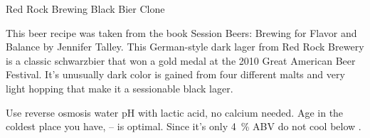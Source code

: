 \stylesection{\styleschwarzbier}

\begin{recipe}{Red Rock Brewing Black Bier Clone}

\begin{aboutblock}
This beer recipe was taken from the book Session Beers: Brewing for Flavor and
Balance by Jennifer Talley. This German-style dark lager from Red Rock Brewery
is a classic schwarzbier that won a gold medal at the 2010 Great American Beer
Festival. It's unusually dark color is gained from four different malts and very
light hopping that make it a sessionable black lager. \sourceaha
\end{aboutblock}


\begin{methodandtiming}
 
\begin{mashsteps}
\end{mashsteps}

\begin{fermentationsteps}
\end{fermentationsteps}

\begin{directions}
Use reverse osmosis water pH with lactic acid, no calcium needed.
Age in the coldest place you have, -- is optimal. Since it's
only 4~\% ABV do not cool below .
\end{directions}

\end{methodandtiming}

\recipebreak

\begin{ingredientsblock}

\begin{malts}
\end{malts}

\begin{hops}
\end{hops}


\end{ingredientsblock}

\end{recipe}

